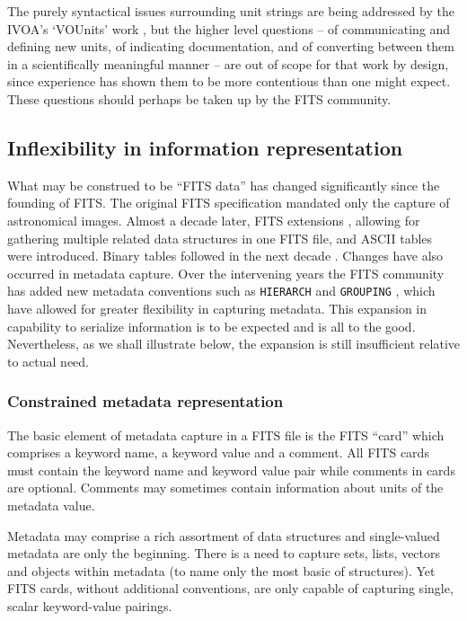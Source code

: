\documentclass[final,authoryear,5p,times,twocolumn]{elsarticle}
\begin{document}
{{The purely syntactical issues surrounding unit strings are 
being addressed by the IVOA's `VOUnits' work \citep{VOUnits}, but the higher
level questions -- of communicating and defining new units, of
indicating documentation, and of converting between them in a
scientifically meaningful manner -- are out of scope for that work by
design, since experience has shown them to be more contentious than
one might expect.  These questions should perhaps be taken up by the FITS community.


\subsection{Inflexibility in information representation}
\label{section_inflex_represent}


What may be construed to be ``FITS data'' has changed significantly
since the founding of FITS. The original FITS specification mandated
only the capture of astronomical images. Almost a decade later, FITS
extensions \citep{1988A&AS...73..359G}, allowing for gathering
multiple related data structures in one FITS file, and ASCII tables
\citep{1988A&AS...73..365H} were introduced. Binary tables followed in
the next decade \citep{1995A&AS..113..159C}. Changes have also
occurred in metadata capture. Over the intervening years the FITS
community has added new metadata conventions such as \texttt{HIERARCH}
\citep{2009Wic} and \texttt{GROUPING} \citep{2007Jen,1995ASPC...77..229J}, which have
allowed for greater flexibility in capturing metadata.
This expansion in capability to serialize information is to be
expected and is all to the good. Nevertheless, as we shall illustrate
below, the expansion is still insufficient relative to actual need.


\subsubsection{Constrained metadata representation}
\label{subsection_information_representation}


The basic element of metadata capture in a FITS file is the FITS
``card'' which comprises a keyword name, a keyword value and a
comment. All FITS cards must contain the keyword name and keyword
value pair while comments in cards are optional. Comments may
sometimes contain information about units of the metadata value.

Metadata may comprise a rich assortment of data structures and
single-valued metadata are only the beginning. There is a need to
capture sets, lists, vectors and objects within metadata (to name only
the most basic of structures). Yet FITS cards, without additional
conventions, are only capable of capturing single, scalar keyword-value
pairings.

}}
\end{document}
